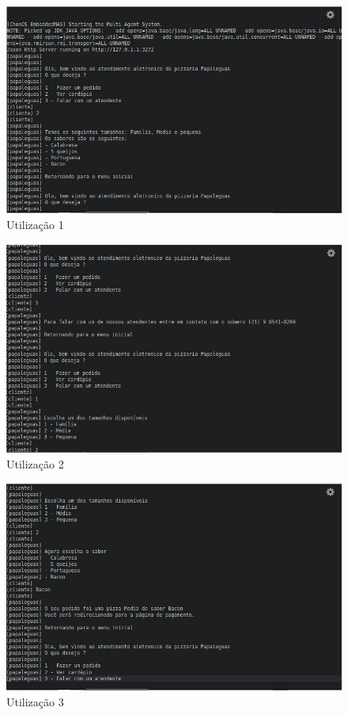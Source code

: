 \documentclass[12pt]{article}
\begin{document}
    \begin{figure}[!ht]
        \centering
        \includegraphics[width=1\textwidth]{figures/imagem01.jpeg}
        \caption{Utilização 1}
        \label{fig:imagem5}
    \end{figure}

    \newpage

    \begin{figure}[!ht]
        \centering
        \includegraphics[width=1\textwidth]{figures/imagem02.jpeg}
        \caption{Utilização 2}
        \label{fig:imagem6}
    \end{figure}

    \begin{figure}[!ht]
        \centering
        \includegraphics[width=1\textwidth]{figures/imagem03.jpeg}
        \caption{Utilização 3}
        \label{fig:imagem5}
    \end{figure}
\end{document}
